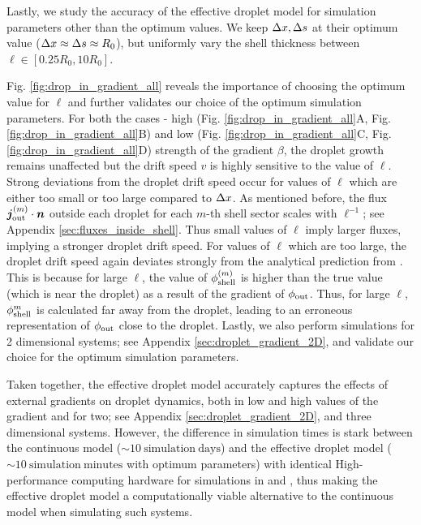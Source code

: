Lastly, we study the accuracy of the effective droplet model for simulation parameters other than the optimum values.
We keep $\Delta x, \Delta s$ at their optimum value ($\Delta x \approx \Delta s \approx R_0$), but uniformly vary the shell thickness between $\ell \in [0.25 R_0, 10R_0]$.

Fig. \ref{fig:drop_in_gradient_all} reveals the importance of choosing the optimum value for $\ell$ and further validates our choice of the optimum simulation parameters.
For both the cases - high (Fig. \ref{fig:drop_in_gradient_all}A, Fig. \ref{fig:drop_in_gradient_all}B) and low (Fig. \ref{fig:drop_in_gradient_all}C, Fig. \ref{fig:drop_in_gradient_all}D) strength of the gradient $\beta$, the droplet growth remains unaffected but the drift speed $v$ is highly sensitive to the value of $\ell$.
Strong deviations from the droplet drift speed occur for values of $\ell$ which are either too small or too large compared to $\Delta x$.
As mentioned before, the flux $\boldsymbol{j}_\mathrm{out}^{(m)} \cdot \boldsymbol{n}$ outside each droplet for each $m$-th shell sector scales with $\ell^{-1}$; see Appendix \ref{sec:fluxes_inside_shell}.
Thus small values of $\ell$ imply larger fluxes, implying a stronger droplet drift speed. 
For values of $\ell$ which are too large, the droplet drift speed again deviates strongly from the analytical prediction from .
This is because for large $\ell$, the value of $\phi_\mathrm{shell}^{(m)}$ is higher than the true value (which is near the droplet) as a result of the gradient of $\phi_\mathrm{out}$.
Thus, for large $\ell$, $\phi_\mathrm{shell}^{m}$ is calculated far away from the droplet, leading to an erroneous representation of $\phi_\mathrm{out}$ close to the droplet.
Lastly, we also perform simulations for 2 dimensional systems; see Appendix \ref{sec:droplet_gradient_2D}, and validate our choice for the optimum simulation parameters. 

Taken together, the effective droplet model accurately captures the effects of external gradients on droplet dynamics, both in low and high values of the gradient and for two; see Appendix \ref{sec:droplet_gradient_2D}, and three dimensional systems. 
However, the difference in simulation times is stark between the continuous model ($\sim 10 \mathrm{~simulation~days}$) and the effective droplet model ($\sim 10 \mathrm{~simulation~minutes}$ with optimum parameters) with identical High-performance computing hardware for simulations in  and , thus making the effective droplet model a computationally viable alternative to the continuous model when simulating such systems.

